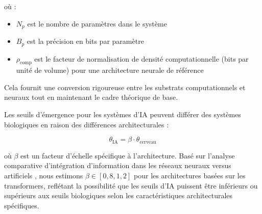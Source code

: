 \documentclass[12pt]{article}
\begin{document}
où :
\begin{itemize}
    \item $N_p$ est le nombre de paramètres dans le système
    \item $B_p$ est la précision en bits par paramètre
    \item $\rho_{\text{comp}}$ est le facteur de normalisation de densité computationnelle (bits par unité de volume) pour une architecture neurale de référence
\end{itemize}

Cela fournit une conversion rigoureuse entre les substrats computationnels et neuraux tout en maintenant le cadre théorique de base.

Les seuils d'émergence pour les systèmes d'IA peuvent différer des systèmes biologiques en raison des différences architecturales :

\begin{equation}
\theta_{\text{IA}} = \beta \cdot \theta_{\text{cerveau}}
\end{equation}

où $\beta$ est un facteur d'échelle spécifique à l'architecture. Basé sur l'analyse comparative d'intégration d'information dans les réseaux neuraux versus artificiels \cite{tononi2016,oizumi2014}, nous estimons $\beta \in [0,8, 1,2]$ pour les architectures basées sur les transformers, reflétant la possibilité que les seuils d'IA puissent être inférieurs ou supérieurs aux seuils biologiques selon les caractéristiques architecturales spécifiques.
\end{document}
